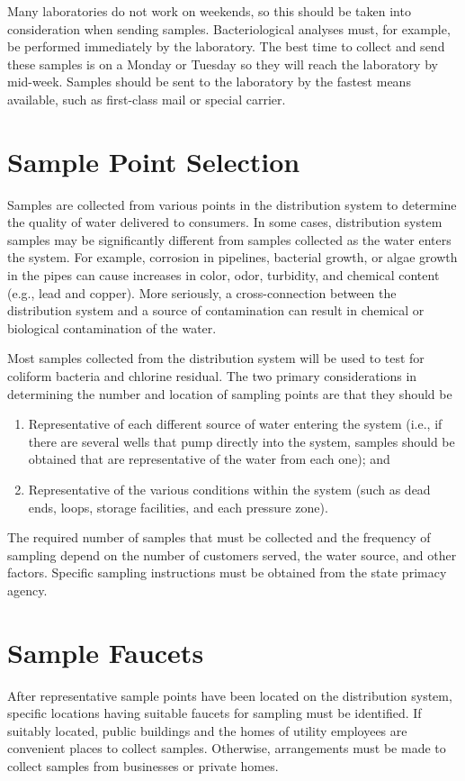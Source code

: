 \documentclass[10pt]{article}
\begin{document}
Many laboratories do not work on weekends, so this should be taken into consideration when sending samples. Bacteriological analyses must, for example, be performed immediately by the laboratory. The best time to collect and send these samples is on a Monday or Tuesday so they will reach the laboratory by mid-week. Samples should be sent to the laboratory by the fastest means available, such as first-class mail or special carrier.

\section{Sample Point Selection}
Samples are collected from various points in the distribution system to determine the quality of water delivered to consumers. In some cases, distribution system samples may be significantly different from samples collected as the water enters the system. For example, corrosion in pipelines, bacterial growth, or algae growth in the pipes can cause increases in color, odor, turbidity, and chemical content (e.g., lead and copper). More seriously, a cross-connection between the distribution system and a source of contamination can result in chemical or biological contamination of the water.

Most samples collected from the distribution system will be used to test for coliform bacteria and chlorine residual. The two primary considerations in determining the number and location of sampling points are that they should be

\begin{enumerate}
  \item Representative of each different source of water entering the system (i.e., if there are several wells that pump directly into the system, samples should be obtained that are representative of the water from each one); and

  \item Representative of the various conditions within the system (such as dead ends, loops, storage facilities, and each pressure zone).

\end{enumerate}
The required number of samples that must be collected and the frequency of sampling depend on the number of customers served, the water source, and other factors. Specific sampling instructions must be obtained from the state primacy agency.

\section{Sample Faucets}
After representative sample points have been located on the distribution system, specific locations having suitable faucets for sampling must be identified. If suitably located, public buildings and the homes of utility employees are convenient places to collect samples. Otherwise, arrangements must be made to collect samples from businesses or private homes.
\end{document}
